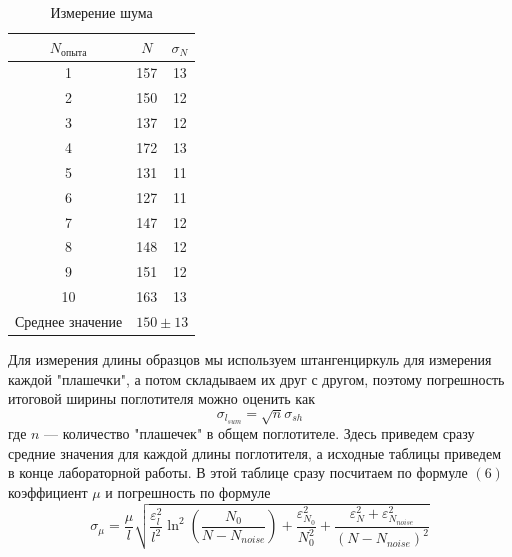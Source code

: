 \documentclass[a4paper, 12pt]{article}%
\begin{document}
\begin{table}[h]
\begin{center}
\begin{tabular}{|c|c|c|}

\hline
$N_{\text{опыта}}$ & $N$          & $\sigma_N$         \\ \hline
1                  & 157          & 13                 \\ \hline
2                  & 150          & 12                 \\ \hline
3                  & 137          & 12                 \\ \hline
4                  & 172          & 13                 \\ \hline
5                  & 131          & 11                 \\ \hline
6                  & 127          & 11                 \\ \hline
7                  & 147          & 12                 \\ \hline
8                  & 148          & 12                 \\ \hline
9                  & 151          & 12                 \\ \hline
10                 & 163          & 13                 \\ \hline
Среднее значение   & \multicolumn{2}{c|}{$150 \pm 13$} \\ \hline
\end{tabular}
\caption{Измерение шума}
\end{center}
\end{table}
Для измерения длины образцов мы используем штангенциркуль для измерения каждой "плашечки", а потом складываем их друг с другом, поэтому погрешность итоговой ширины поглотителя можно оценить как 
\[\sigma_{l_{sum}} = \sqrt{n}\sigma_{sh}\]
где $n$ --- количество "плашечек" в общем поглотителе.
Здесь приведем сразу средние значения для каждой длины поглотителя, а исходные таблицы приведем в конце лабораторной работы. В этой таблице сразу посчитаем по формуле $(6)$ коэффициент $\mu$ и погрешность по формуле
\[\sigma_{\mu} = \frac{\mu}{l}\sqrt{\frac{\varepsilon_l^2}{l^2} \ln^2\left(\frac{N_0}{N - N_{noise}}\right) + \frac{\varepsilon_{N_0}^2}{N_0^2} + \frac{\varepsilon_N^2 + \varepsilon_{N_{noise}}^2}{(N - N_{noise})^2}}\]
\end{document}
